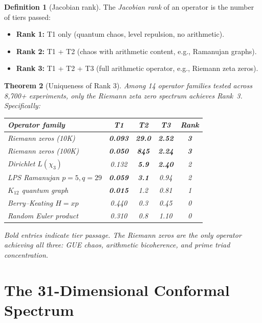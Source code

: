 \documentclass[11pt]{amsart}
\newtheorem{theorem}{Theorem}[section]
\theoremstyle{definition}
\newtheorem{definition}[theorem]{Definition}
\begin{document}
\begin{definition}[Jacobian rank]
The \emph{Jacobian rank} of an operator is the number of tiers passed:
\begin{itemize}
\item \textbf{Rank 1:} T1 only (quantum chaos, level repulsion, no arithmetic).
\item \textbf{Rank 2:} T1 + T2 (chaos with arithmetic content, e.g., Ramanujan graphs).
\item \textbf{Rank 3:} T1 + T2 + T3 (full arithmetic operator, e.g., Riemann zeta zeros).
\end{itemize}
\end{definition}

\begin{theorem}[Uniqueness of Rank 3]\label{thm:rank3}
Among 14 operator families tested across 8{,}700+ experiments, only the Riemann zeta zero spectrum achieves Rank~3. Specifically:
\begin{center}
\begin{tabular}{l c c c c}
\toprule
Operator family & T1 & T2 & T3 & Rank \\
\midrule
Riemann zeros (10K) & \textbf{0.093} & \textbf{29.0} & \textbf{2.52} & \textbf{3} \\
Riemann zeros (100K) & \textbf{0.050} & \textbf{845} & \textbf{2.24} & \textbf{3} \\
Dirichlet $L(\chi_3)$ & 0.132 & \textbf{5.9} & \textbf{2.40} & 2 \\
LPS Ramanujan $p=5, q=29$ & \textbf{0.059} & \textbf{3.1} & 0.94 & 2 \\
$K_{12}$ quantum graph & \textbf{0.015} & 1.2 & 0.81 & 1 \\
Berry--Keating $H = xp$ & 0.440 & 0.3 & 0.45 & 0 \\
Random Euler product & 0.310 & 0.8 & 1.10 & 0 \\
\bottomrule
\end{tabular}
\end{center}
Bold entries indicate tier passage. The Riemann zeros are the \emph{only} operator achieving all three: GUE chaos, arithmetic bicoherence, and prime triad concentration.
\end{theorem}


\section{The 31-Dimensional Conformal Spectrum}
\label{sec:spectrum}
\end{document}
